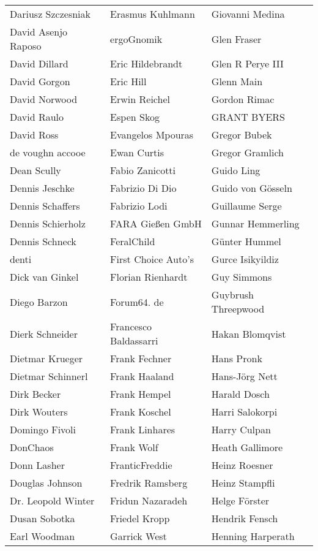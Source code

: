 \begin{tabular}{p{4.5cm}p{4.5cm}p{4.5cm}}
Dariusz Szczesniak & Erasmus Kuhlmann & Giovanni Medina \\
David Asenjo Raposo & ergoGnomik & Glen Fraser \\
David Dillard & Eric Hildebrandt & Glen R Perye III \\
David Gorgon & Eric Hill & Glenn Main \\
David Norwood & Erwin Reichel & Gordon Rimac \\
David Raulo & Espen Skog & GRANT BYERS \\
David Ross & Evangelos Mpouras & Gregor Bubek \\
de voughn accooe & Ewan Curtis & Gregor Gramlich \\
Dean Scully & Fabio Zanicotti & Guido Ling \\
Dennis Jeschke & Fabrizio Di Dio & Guido von Gösseln \\
Dennis Schaffers & Fabrizio Lodi & Guillaume Serge \\
Dennis Schierholz & FARA Gießen GmbH & Gunnar Hemmerling \\
Dennis Schneck & FeralChild & Günter Hummel \\
denti & First Choice Auto's & Gurce Isikyildiz \\
Dick van Ginkel & Florian Rienhardt & Guy Simmons \\
Diego Barzon & Forum64. de & Guybrush Threepwood \\
Dierk Schneider & Francesco Baldassarri & Hakan Blomqvist \\
Dietmar Krueger & Frank Fechner & Hans Pronk \\
Dietmar Schinnerl & Frank Haaland & Hans-Jörg Nett \\
Dirk Becker & Frank Hempel & Harald Dosch \\
Dirk Wouters & Frank Koschel & Harri Salokorpi \\
Domingo Fivoli & Frank Linhares & Harry Culpan \\
DonChaos & Frank Wolf & Heath Gallimore \\
Donn Lasher & FranticFreddie & Heinz Roesner \\
Douglas Johnson & Fredrik Ramsberg & Heinz Stampfli \\
Dr. Leopold Winter & Fridun Nazaradeh & Helge Förster \\
Dusan Sobotka & Friedel Kropp & Hendrik Fensch \\
Earl Woodman & Garrick West & Henning Harperath \\

\end{tabular}
